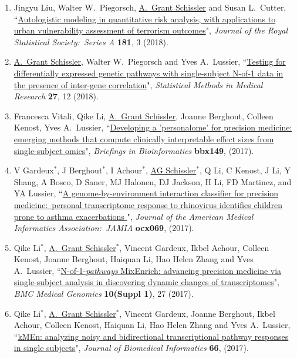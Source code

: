 \documentclass[paper=a4,fontsize=11pt]{scrartcl} %
\newcommand{\PaperEntry}[7]{
		\noindent #1, ``\href{#7}{#2}", \textit{#3} \textbf{#4}, #5 (#6).}
\begin{document}
\begin{enumerate}
\item \PaperEntry{Jingyu Liu, Walter W.~Piegorsch, \underline{A.~Grant Schissler} and Susan L.~Cutter}{Autologistic modeling in quantitative risk analysis, with applications to urban vulnerability assessment of terrorism outcomes}{Journal of the Royal Statistical Society:~Series A}{181}{3}{2018}{http://dx.doi.org/10.1111/rssa.12323}
  
  \item \PaperEntry{\underline{A.~Grant Schissler}, Walter W.~Piegorsch and Yves A.~Lussier}{Testing for differentially expressed genetic pathways with single-subject N-of-1 data in the presence of inter-gene correlation}{Statistical Methods in Medical Research}{27}{12}{2018}{http://journals.sagepub.com/doi/10.1177/0962280217712271}

\item \PaperEntry{Francesca Vitali, Qike Li, \underline{A.~Grant Schissler}, Joanne Berghout, Colleen Kenost, Yves A.~Lussier}{Developing a 'personalome' for precision medicine: emerging methods that compute clinically interpretable effect sizes from single-subject omics}{Briefings in Bioinformatics}{bbx149}{}{2017}{https://academic.oup.com/bib/advance-article/doi/10.1093/bib/bbx149/4758622}

  \item \PaperEntry{V Gardeux$^{*}$, J Berghout$^{*}$, I Achour$^{*}$, \underline{AG Schissler}$^{*}$, Q Li, C Kenost, J Li, Y Shang, A Bosco, D Saner, MJ Halonen, DJ Jackson, H Li, FD Martinez, and YA Lussier}{A genome-by-environment interaction classifier for precision medicine:~personal transcriptome response to rhinovirus identifies children prone to asthma exacerbations
}{Journal of the American Medical Informatics Association:~JAMIA}{ocx069}{}{2017}{https://academic.oup.com/jamia/article-abstract/doi/10.1093/jamia/ocx069/4004728/A-genome-by-environment-interaction-classifier-for?redirectedFrom=fulltext}

\item \PaperEntry{Qike Li$^{*}$, \underline{A.~Grant Schissler$^{*}$}, Vincent Gardeux, Ikbel Achour, Colleen Kenost, Joanne Berghout, Haiquan Li, Hao Helen Zhang and Yves A.~Lussier}{N-of-1-\emph{pathways} MixEnrich: advancing precision medicine via single-subject analysis in discovering dynamic changes of transcriptomes}{BMC Medical Genomics}{10(Suppl 1)}{27}{2017}{https://bmcmedgenomics.biomedcentral.com/articles/10.1186/s12920-017-0263-4}

\item \PaperEntry{Qike Li$^{*}$, \underline{A.~Grant Schissler}$^{*}$, Vincent Gardeux, Joanne Berghout, Ikbel Achour, Colleen Kenost, Haiquan Li, Hao Helen Zhang and Yves A.~Lussier}{kMEn: analyzing noisy and bidirectional transcriptional pathway responses in single subjects}{Journal of Biomedical Informatics}{66}{}{2017}{http://www.sciencedirect.com/science/article/pii/S1532046416301836}


\end{enumerate}
\end{document}
